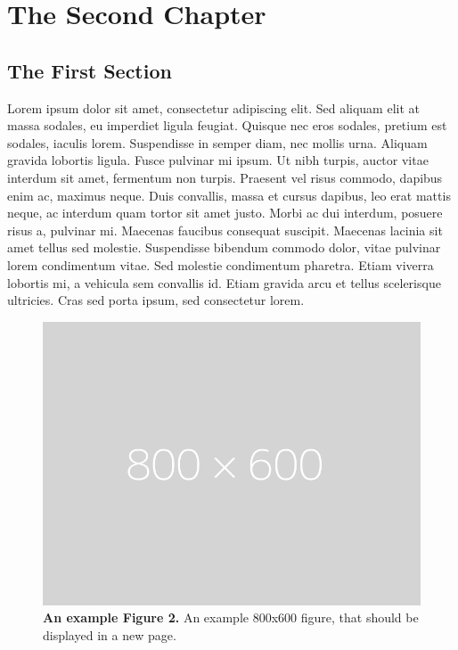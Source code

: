 \chapter{The Second Chapter}
\section{The First Section}
Lorem ipsum dolor sit amet, consectetur adipiscing elit. Sed aliquam elit at massa sodales, eu imperdiet ligula feugiat. Quisque nec eros sodales, pretium est sodales, iaculis lorem. Suspendisse in semper diam, nec mollis urna. Aliquam gravida lobortis ligula. Fusce pulvinar mi ipsum. Ut nibh turpis, auctor vitae interdum sit amet, fermentum non turpis. Praesent vel risus commodo, dapibus enim ac, maximus neque. Duis convallis, massa et cursus dapibus, leo erat mattis neque, ac interdum quam tortor sit amet justo. Morbi ac dui interdum, posuere risus a, pulvinar mi. Maecenas faucibus consequat suscipit. Maecenas lacinia sit amet tellus sed molestie. Suspendisse bibendum commodo dolor, vitae pulvinar lorem condimentum vitae. Sed molestie condimentum pharetra. Etiam viverra lobortis mi, a vehicula sem convallis id. Etiam gravida arcu et tellus scelerisque ultricies. Cras sed porta ipsum, sed consectetur lorem.

\begin{figure}[p]
    \centering
    \includegraphics[width=\textwidth]{figures/placeholder.png}
    \caption[An example Figure 2.]{\textbf{An example Figure 2.} An example 800x600 figure, that should be displayed in a new page.}
    \label{figlabel2}
\end{figure}

